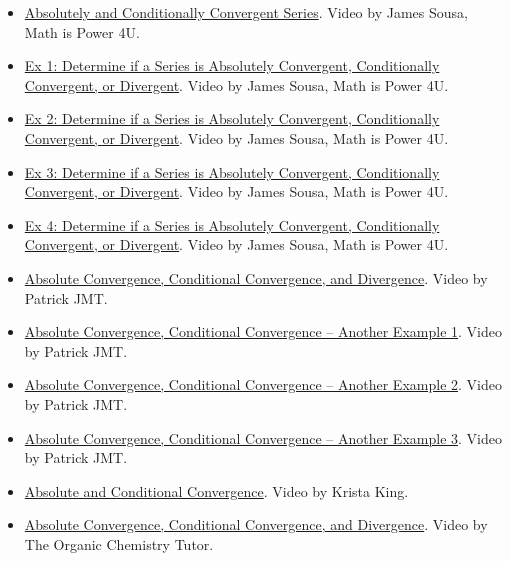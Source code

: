 \begin{itemize}

\item \href{https://www.youtube.com/watch?v=rEyeRKd3TWo}{Absolutely and Conditionally Convergent Series}. 
Video by James Sousa, Math is Power 4U.

\item \href{https://www.youtube.com/watch?v=NHkxgvXVH7g}{Ex 1: Determine if a Series is Absolutely Convergent, Conditionally Convergent, or Divergent}. 
Video by James Sousa, Math is Power 4U.

\item \href{https://www.youtube.com/watch?v=awNWNGkD6Vk}{Ex 2: Determine if a Series is Absolutely Convergent, Conditionally Convergent, or Divergent}. 
Video by James Sousa, Math is Power 4U.

\item \href{https://www.youtube.com/watch?v=kP9sMcirMqw}{Ex 3: Determine if a Series is Absolutely Convergent, Conditionally Convergent, or Divergent}. 
Video by James Sousa, Math is Power 4U.

\item \href{https://www.youtube.com/watch?v=xGQ-sR2KLwc}{Ex 4: Determine if a Series is Absolutely Convergent, Conditionally Convergent, or Divergent}. 
Video by James Sousa, Math is Power 4U.

\item \href{https://www.youtube.com/watch?v=6hOeqjoQvNw}{Absolute Convergence, Conditional Convergence, and Divergence}. 
Video by Patrick JMT.

\item \href{https://www.youtube.com/watch?v=UvWgxCSypFc}{Absolute Convergence, Conditional Convergence – Another Example 1}. 
Video by Patrick JMT.

\item \href{https://www.youtube.com/watch?v=XQLa66wZYI4}{Absolute Convergence, Conditional Convergence – Another Example 2}. 
Video by Patrick JMT.

\item \href{https://www.youtube.com/watch?v=_OYmHjNQV1A}{Absolute Convergence, Conditional Convergence – Another Example 3}. 
Video by Patrick JMT.

\item \href{https://www.youtube.com/watch?v=8h9Eo148IF4}{Absolute and Conditional Convergence}. 
Video by Krista King.

\item \href{https://www.youtube.com/watch?v=FPK6LO1iiXc}{Absolute Convergence, Conditional Convergence, and Divergence}. 
Video by The Organic Chemistry Tutor.

\end{itemize}

